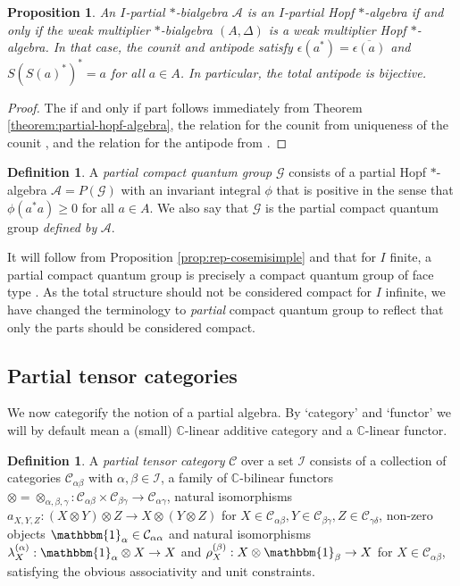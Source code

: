 \documentclass[10pt]{article}
\newcommand{\C}{\mathbb{C}}
\newcommand{\CatC}{\mathcal{C}}
\newcommand{\CatCC}{\mathscr{C}}
\newcommand{\Unitb}{\mathbbm{1}}
\newtheorem{Prop}[Theorem]{Proposition}
\theoremstyle{definition}
\newtheorem{Def}[Theorem]{Definition}
\numberwithin{equation}{section}
\begin{document}
\begin{Prop} \label{cor:involutive}
  An $I$-partial $*$-bialgebra $\mathscr{A}$ is an $I$-partial Hopf
  $*$-algebra if and only if the weak multiplier $*$-bialgebra
  $(A,\Delta)$ is a weak multiplier Hopf $*$-algebra. In that case,
  the counit and antipode satisfy
  $\epsilon(a^{*})=\overline{\epsilon(a)}$ and $S(S(a)^{*})^{*}=a$ for
  all $a\in A$. In particular, the total antipode is bijective.
\end{Prop}
\begin{proof}
  The if and only if part follows immediately from  Theorem
  \ref{theorem:partial-hopf-algebra}, the relation for the counit  from
uniqueness of the counit  \cite[Theorem 2.8]{Boh1}, and the relation
for the antipode from \cite[Proposition 4.11]{VDW1}.
\end{proof}

\begin{Def}\label{DefPCQG} A \emph{partial compact quantum group} $\mathscr{G}$ consists of a
  partial Hopf $*$-algebra $\mathscr{A} = P(\mathscr{G})$ with an invariant integral  $\phi$ that is positive in the sense  that $\phi(a^*a)\geq 0$ for all $a\in A$. We also say that $\mathscr{G}$ is the partial compact quantum group \emph{defined by} $\mathscr{A}$.
\end{Def} 

It will follow from Proposition \ref{prop:rep-cosemisimple} and  \cite[Theorem 3.3 and Theorem 4.4]{Hay1} that for $I$ finite, a partial compact quantum group is precisely a compact quantum group of face type \cite[Definition 4.1]{Hay1}. As the total structure should not be considered compact for $I$ infinite, we have changed the terminology to \emph{partial} compact quantum group to reflect that only the parts should be considered compact.

\subsection{Partial tensor categories}\label{SecPartTen}

We now categorify the notion of a partial algebra. By `category' and
`functor' we will by default mean a (small) $\C$-linear additive
category and a $\C$-linear functor. 

\begin{Def} A \emph{partial tensor category} $\CatCC$ over a set $\mathscr{I}$ consists of  a collection of categories $\mathcal{C}_{\alpha\beta}$ with $\alpha,\beta\in \mathscr{I}$, a family of $\C$-bilinear functors $\otimes = \otimes_{\alpha,\beta,\gamma}: \CatC_{\alpha\beta}\times \CatC_{\beta\gamma}\rightarrow \CatC_{\alpha\gamma}$, natural isomorphisms $a_{X,Y,Z}: (X\otimes Y)\otimes Z \rightarrow X\otimes (Y\otimes Z)$ for $X \in \CatC_{\alpha\beta},Y\in \CatC_{\beta\gamma},Z\in \CatC_{\gamma\delta}$, non-zero objects $\Unitb_{\alpha} \in \CatC_{\alpha\alpha}$ and natural isomorphisms $\lambda_X^{(\alpha)}:\Unitb_\alpha\otimes X \rightarrow X$ and $\rho_X^{(\beta)}:X\otimes \Unitb_\beta\rightarrow X$ for $X\in \CatC_{\alpha\beta}$, satisfying the obvious associativity and unit constraints. 
\end{Def}
\end{document}
